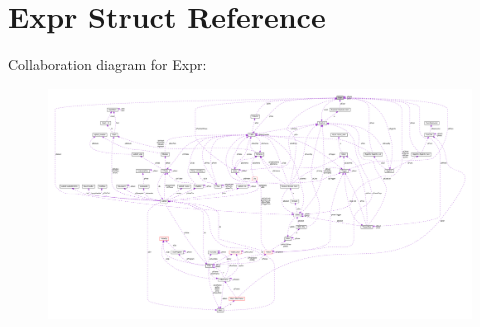 \hypertarget{structExpr}{}\section{Expr Struct Reference}
\label{structExpr}


Collaboration diagram for Expr\+:\nopagebreak
\begin{figure}[H]
\begin{center}
\leavevmode
\includegraphics[width=350pt]{structExpr__coll__graph}
\end{center}
\end{figure}
